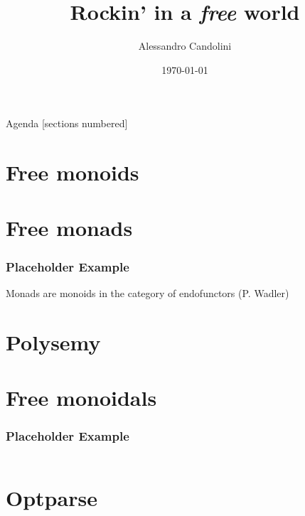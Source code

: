 \documentclass[10pt]{beamer}
\title{Rockin' in a \emph{free} world}
\date{\today}
\author[Alessandro Candolini]{Alessandro Candolini}
\begin{document}
\maketitle

\begin{frame}{Agenda}
  [sections numbered]
  \tableofcontents[hideallsubsections]
\end{frame}


\section{Free monoids}





\section{Free monads}
\begin{frame}[fragile]
  \frametitle{Placeholder Example}
  Monads are monoids in the category of endofunctors (P. Wadler) 
\end{frame}  




\section{Polysemy}


\section{Free monoidals}
\begin{frame}[fragile]
  \frametitle{Placeholder Example}
  \begin{lstlisting}[language=haskell]
  \end{lstlisting}
\end{frame}

\section{Optparse}


% 
% 
\end{document}
